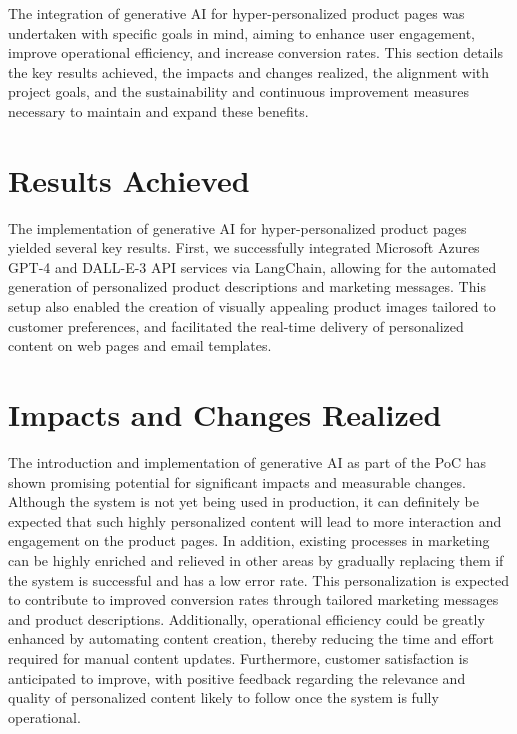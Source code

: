 \documentclass[%
pdftex,
oneside,			%
11pt,				%
parskip=half,		%
headheight = 12pt,	%
headsepline,		%
footsepline,		%
footheight = 16pt,	%
abstracton,		%
DIV=calc,		%
BCOR=8mm,		%
headinclude=false,	%
footinclude=false,	%
listof=totoc,		%
toc=bibliography,	%
]{scrreprt}	%
\begin{document}
    The integration of generative AI for hyper-personalized product pages was undertaken with specific goals in mind, aiming to enhance user engagement, improve operational efficiency, and increase conversion rates. 
    This section details the key results achieved, the impacts and changes realized, the alignment with project goals, and the sustainability and continuous improvement measures necessary to maintain and expand these benefits.

    \section{Results Achieved}

        The implementation of generative AI for hyper-personalized product pages yielded several key results. 
        First, we successfully integrated Microsoft Azures GPT-4 and DALL-E-3 API services via LangChain, allowing for the automated generation of personalized product descriptions and marketing messages. 
        This setup also enabled the creation of visually appealing product images tailored to customer preferences, and facilitated the real-time delivery of personalized content on web pages and email templates.

    \section{Impacts and Changes Realized}


        The introduction and implementation of generative AI as part of the PoC has shown promising potential for significant impacts and measurable changes. 
        Although the system is not yet being used in production, it can definitely be expected that such highly personalized content will lead to more interaction and engagement on the product pages.
        In addition, existing processes in marketing can be highly enriched and relieved in other areas by gradually replacing them if the system is successful and has a low error rate.
        This personalization is expected to contribute to improved conversion rates through tailored marketing messages and product descriptions. 
        Additionally, operational efficiency could be greatly enhanced by automating content creation, thereby reducing the time and effort required for manual content updates. 
        Furthermore, customer satisfaction is anticipated to improve, with positive feedback regarding the relevance and quality of personalized content likely to follow once the system is fully operational.
\end{document}
